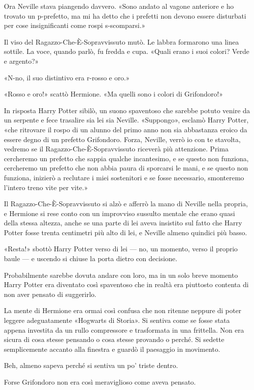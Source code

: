 Ora Neville stava piangendo davvero. «Sono andato al vagone anteriore e ho trovato un p-prefetto, ma mi ha detto che i prefetti non devono essere disturbati per cose insignificanti come rospi s-scomparsi.»

Il viso del Ragazzo-Che-È-Sopravvissuto mutò. Le labbra formarono una linea sottile. La voce, quando parlò, fu fredda e cupa. «Quali erano i suoi colori? Verde e argento?»

«N-no, il suo distintivo era r-rosso e oro.»

«Rosso e oro!» scattò Hermione. «Ma quelli sono i colori di Grifondoro!»

In risposta Harry Potter sibilò, un suono spaventoso che sarebbe potuto venire da un serpente e fece trasalire sia lei sia Neville. «Suppongo», esclamò Harry Potter, «che ritrovare il rospo di un alunno del primo anno non sia abbastanza eroico da essere degno di un prefetto Grifondoro. Forza, Neville, verrò io con te stavolta, vedremo se il Ragazzo-Che-È-Sopravvissuto riceverà più attenzione. Prima cercheremo un prefetto che sappia qualche incantesimo, e se questo non funziona, cercheremo un prefetto che non abbia paura di sporcarsi le mani, e se questo non funziona, inizierò a reclutare i miei sostenitori e se fosse necessario, smonteremo l’intero treno vite per vite.»

Il Ragazzo-Che-È-Sopravvissuto si alzò e afferrò la mano di Neville nella propria, e Hermione si rese conto con un improvviso sussulto mentale che erano quasi della stessa altezza, anche se una parte di lei aveva insistito sul fatto che Harry Potter fosse trenta centimetri più alto di lei, e Neville almeno quindici più basso.

«Resta!» sbottò Harry Potter verso di lei — no, un momento, verso il proprio baule — e uscendo si chiuse la porta dietro con decisione.

Probabilmente sarebbe dovuta andare con loro, ma in un solo breve momento Harry Potter era diventato così spaventoso che in realtà era piuttosto contenta di non aver pensato di suggerirlo.

La mente di Hermione era ormai così confusa che non ritenne neppure di poter leggere adeguatamente «Hogwarts di Storia». Si sentiva come se fosse stata appena investita da un rullo compressore e trasformata in una frittella. Non era sicura di cosa stesse pensando o cosa stesse provando o perché. Si sedette semplicemente accanto alla finestra e guardò il paesaggio in movimento.

Beh, almeno sapeva perché si sentiva un po’ triste dentro.

Forse Grifondoro non era così meraviglioso come aveva pensato.



